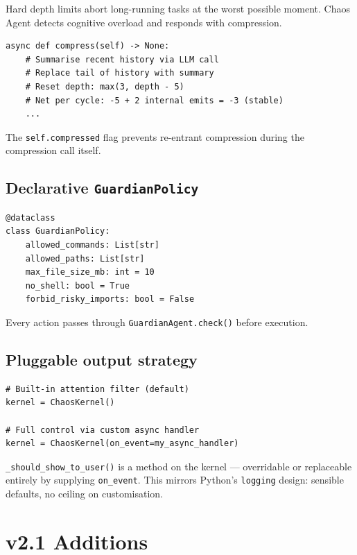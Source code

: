 \documentclass[11pt, a4paper]{article}
\begin{document}
Hard depth limits abort long-running tasks at the worst possible moment.
Chaos Agent detects cognitive overload and responds with compression.

\begin{lstlisting}[caption={Depth resets gracefully — no exception raised}]
async def compress(self) -> None:
    # Summarise recent history via LLM call
    # Replace tail of history with summary
    # Reset depth: max(3, depth - 5)
    # Net per cycle: -5 + 2 internal emits = -3 (stable)
    ...
\end{lstlisting}

The \texttt{self.compressed} flag prevents re-entrant compression during the
compression call itself.

\subsection{Declarative \texttt{GuardianPolicy}}

\begin{lstlisting}[caption={Policy is data — swap without touching agent logic}]
@dataclass
class GuardianPolicy:
    allowed_commands: List[str]
    allowed_paths: List[str]
    max_file_size_mb: int = 10
    no_shell: bool = True
    forbid_risky_imports: bool = False
\end{lstlisting}

Every action passes through \texttt{GuardianAgent.check()} before execution.

\subsection{Pluggable output strategy}

\begin{lstlisting}[caption={Two strategies coexist — caller chooses}]
# Built-in attention filter (default)
kernel = ChaosKernel()

# Full control via custom async handler
kernel = ChaosKernel(on_event=my_async_handler)
\end{lstlisting}

\texttt{\_should\_show\_to\_user()} is a method on the kernel — overridable or
replaceable entirely by supplying \texttt{on\_event}. This mirrors Python's
\texttt{logging} design: sensible defaults, no ceiling on customisation.

\section{v2.1 Additions}
\end{document}
